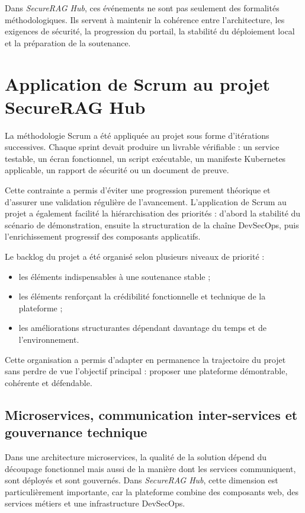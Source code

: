 Dans \textit{SecureRAG Hub}, ces événements ne sont pas seulement des formalités méthodologiques. Ils servent à maintenir la cohérence entre l’architecture, les exigences de sécurité, la progression du portail, la stabilité du déploiement local et la préparation de la soutenance.

\section{Application de Scrum au projet SecureRAG Hub}

La méthodologie Scrum a été appliquée au projet sous forme d’itérations successives. Chaque sprint devait produire un livrable vérifiable : un service testable, un écran fonctionnel, un script exécutable, un manifeste Kubernetes applicable, un rapport de sécurité ou un document de preuve.

Cette contrainte a permis d’éviter une progression purement théorique et d’assurer une validation régulière de l’avancement. L’application de Scrum au projet a également facilité la hiérarchisation des priorités : d’abord la stabilité du scénario de démonstration, ensuite la structuration de la chaîne DevSecOps, puis l’enrichissement progressif des composants applicatifs.

Le backlog du projet a été organisé selon plusieurs niveaux de priorité :

\begin{itemize}
    \item les éléments indispensables à une soutenance stable ;
    \item les éléments renforçant la crédibilité fonctionnelle et technique de la plateforme ;
    \item les améliorations structurantes dépendant davantage du temps et de l’environnement.
\end{itemize}

Cette organisation a permis d’adapter en permanence la trajectoire du projet sans perdre de vue l’objectif principal : proposer une plateforme démontrable, cohérente et défendable.

\subsection{Microservices, communication inter-services et gouvernance technique}

Dans une architecture microservices, la qualité de la solution dépend du découpage fonctionnel mais aussi de la manière dont les services communiquent, sont déployés et sont gouvernés. Dans \textit{SecureRAG Hub}, cette dimension est particulièrement importante, car la plateforme combine des composants web, des services métiers et une infrastructure DevSecOps.

